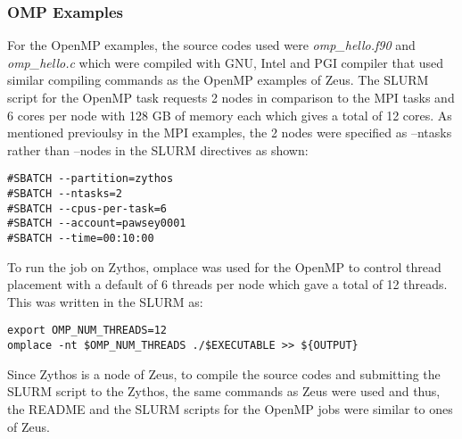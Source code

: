 \subsubsection{OMP Examples}

For the OpenMP examples, the source codes used were \emph{omp\_hello.f90} and \emph{omp\_hello.c} which were compiled with GNU, Intel and PGI compiler 
that used similar compiling commands as the OpenMP examples of Zeus. The SLURM script for the OpenMP task requests 2 nodes in comparison to the MPI tasks 
and 6 cores per node with 128 GB of memory each which gives a total of 12 cores. As mentioned previoulsy in the MPI examples, the 2 nodes were specified 
as --ntasks rather than --nodes in the SLURM directives as shown:

\begin{tcolorbox}
\begin{Verbatim}[fontsize=\scriptsize]
#SBATCH --partition=zythos
#SBATCH --ntasks=2
#SBATCH --cpus-per-task=6
#SBATCH --account=pawsey0001
#SBATCH --time=00:10:00
\end{Verbatim}
\end{tcolorbox}

To run the job on Zythos, omplace was used for the OpenMP to control thread placement with a default of 6 threads per node which gave a total of 12 
threads. This was written in the SLURM as:

\begin{tcolorbox}
\begin{Verbatim}[fontsize=\scriptsize]
export OMP_NUM_THREADS=12
omplace -nt $OMP_NUM_THREADS ./$EXECUTABLE >> ${OUTPUT}
\end{Verbatim}
\end{tcolorbox}

Since Zythos is a node of Zeus, to compile the source codes and submitting the SLURM script to the Zythos, the same commands as Zeus were used and thus,
the README and the SLURM scripts for the OpenMP jobs were similar to ones of Zeus.

